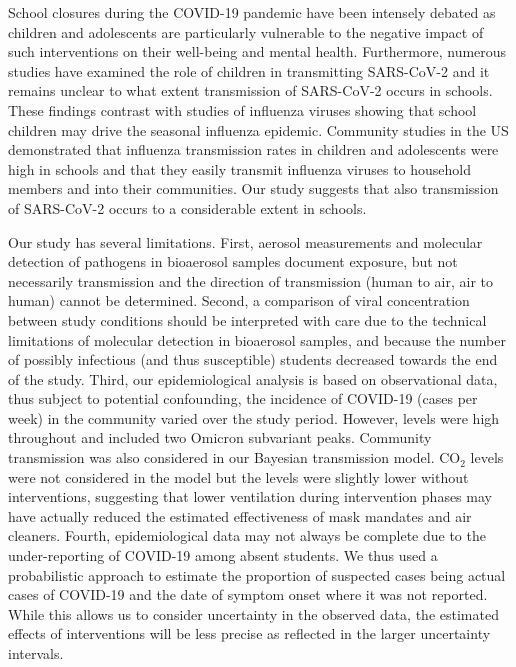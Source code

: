 \documentclass[fleqn,11pt]{wlscirep}
\begin{document}
{School closures during the COVID-19 pandemic have been intensely debated as children and adolescents are particularly vulnerable to the negative impact of such interventions on their well-being and mental health\cite{Loades2020}. Furthermore, numerous studies have examined the role of children in transmitting SARS-CoV-2\cite{Goldstein2021} and it remains unclear to what extent transmission of SARS-CoV-2 occurs in schools\cite{Ulyte2021Clustering}. These findings contrast with studies of influenza viruses showing that school children may drive the seasonal influenza epidemic. Community studies in the US demonstrated that influenza transmission rates in children and adolescents were high in schools and that they easily transmit influenza viruses to household members and into their communities\cite{Glezen1978,Shang2018,Fiore2012}. Our study suggests that also transmission of SARS-CoV-2 occurs to a considerable extent in schools. 

Our study has several limitations. First, aerosol measurements and molecular detection of pathogens in bioaerosol samples document exposure, but not necessarily transmission and the direction of transmission (human to air, air to human) cannot be determined. Second, a comparison of viral concentration between study conditions should be interpreted with care due to the technical limitations of molecular detection in bioaerosol samples, and because the number of possibly infectious (and thus susceptible) students decreased towards the end of the study. Third, our epidemiological analysis is based on observational data, thus subject to potential confounding, \eg the incidence of COVID-19 (cases per week) in the community varied over the study period. However, levels were high throughout and included two Omicron subvariant peaks. Community transmission was also considered in our Bayesian transmission model. CO$_2$ levels were not considered in the model but the levels were slightly lower without interventions, suggesting that lower ventilation during intervention phases may have actually reduced the estimated effectiveness of mask mandates and air cleaners. Fourth, epidemiological data may not always be complete due to the under-reporting of COVID-19 among absent students. We thus used a probabilistic approach to estimate the proportion of suspected cases being actual cases of COVID-19 and the date of symptom onset where it was not reported. While this allows us to consider uncertainty in the observed data, the estimated effects of interventions will be less precise as reflected in the larger uncertainty intervals. 

}
\end{document}
